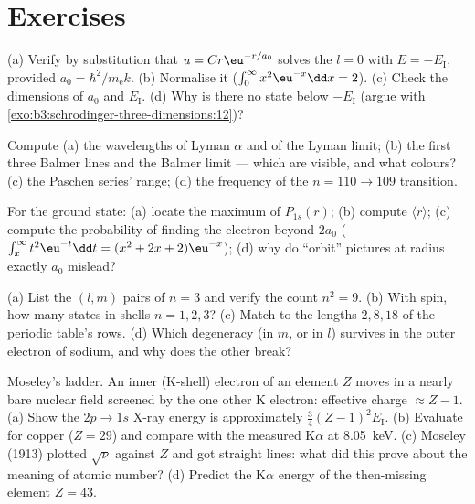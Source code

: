 \section{Exercises}

\begin{exercise}[$\star$]\label{exo:b3:hydrogen-atom:1}
(a) Verify by substitution that $u = Cr\eu^{-r/a_0}$ solves the
$l = 0$  with $E = -E_{\text{I}}$, provided $a_0 =
\hbar^2/m_{\text{e}}k$. (b) Normalise it ($\int_0^\infty
x^2\eu^{-x}\dd x = 2$). (c) Check the dimensions of $a_0$ and
$E_{\text{I}}$. (d) Why is there no state below $-E_{\text{I}}$
(argue with \cref{exo:b3:schrodinger-three-dimensions:12})?
\end{exercise}

\begin{exercise}[$\star$]\label{exo:b3:hydrogen-atom:2}
Compute (a) the wavelengths of Lyman $\alpha$ and of the Lyman
limit; (b) the first three Balmer lines and the Balmer limit ---
which are visible, and what colours? (c) the Paschen series' range;
(d) the frequency of the $n = 110 \to 109$ transition.
\end{exercise}

\begin{exercise}[$\star$]\label{exo:b3:hydrogen-atom:3}
For the ground state: (a) locate the maximum of $P_{1s}(r)$; (b)
compute $\langle r\rangle$; (c) compute the probability of finding
the electron beyond $2a_0$ ($\int_x^\infty t^2\eu^{-t}\dd t = (x^2 +
2x + 2)\eu^{-x}$); (d) why do ``orbit'' pictures at radius exactly
$a_0$ mislead?
\end{exercise}

\begin{exercise}[$\star$]\label{exo:b3:hydrogen-atom:4}
(a) List the $(l, m)$ pairs of $n = 3$ and verify the count $n^2 =
9$. (b) With spin, how many states in shells $n = 1, 2, 3$? (c)
Match to the lengths $2, 8, 18$ of the periodic table's rows. (d)
Which degeneracy (in $m$, or in $l$) survives in the outer electron
of sodium, and why does the other break?
\end{exercise}

\begin{exercise}[$\star\star$]\label{exo:b3:hydrogen-atom:5}
Moseley's ladder. An inner (K-shell) electron of an element $Z$
moves in a nearly bare nuclear field screened by the one other K
electron: effective charge $\approx Z - 1$. (a) Show the $2p \to 1s$
X-ray energy is approximately $\tfrac34(Z-1)^2E_{\text{I}}$. (b)
Evaluate for copper ($Z = 29$) and compare with the measured
K$\alpha$ at \qty{8.05}{keV}. (c) Moseley (1913) plotted
$\sqrt{\nu}$ against $Z$ and got straight lines: what did this prove
about the meaning of atomic number? (d) Predict the K$\alpha$ energy
of the then-missing element $Z = 43$.
\end{exercise}

